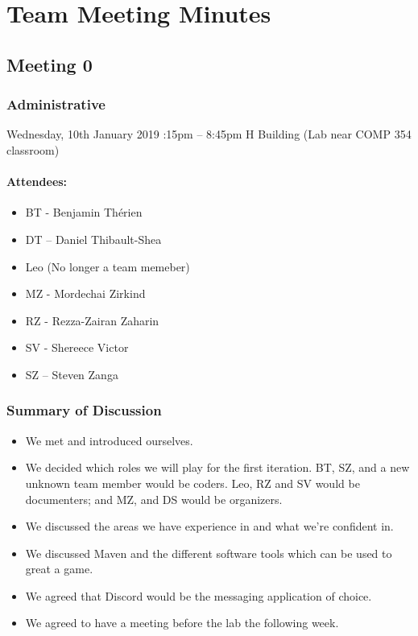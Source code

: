 \documentclass[10pt, a4paper]{article}
\begin{document}
			\section{Team Meeting Minutes}
			\subsection{Meeting 0}
			
			\subsubsection{Administrative}
			Wednesday, 10th January 2019 :15pm – 8:45pm \textbar  H Building (Lab near COMP 354 classroom)  
			\paragraph{Attendees:}
			\begin{itemize}
				\item BT - Benjamin Th\'erien
				\item DT – Daniel Thibault-Shea
				\item Leo (No longer a team memeber)
				\item MZ - Mordechai Zirkind 
				\item RZ - Rezza-Zairan Zaharin
				\item SV - Shereece Victor
				\item SZ – Steven Zanga
			\end{itemize}
			
			
			\subsubsection{Summary of Discussion }
			\begin{itemize}
				\item We met and introduced ourselves. 
				\item We decided which roles we will play for the first iteration. 
				BT, SZ, and a new unknown team member would be coders. 
				Leo, RZ and SV would be documenters; and MZ, and DS would be organizers. 
				\item We discussed the areas we have experience in and what we're confident in. 
				\item We discussed Maven and the different software tools which can be used to great a game.
				\item We agreed that Discord would be the messaging application of choice.   
				\item We agreed to have a meeting before the lab the following week. 
			\end{itemize}
			
\end{document}

